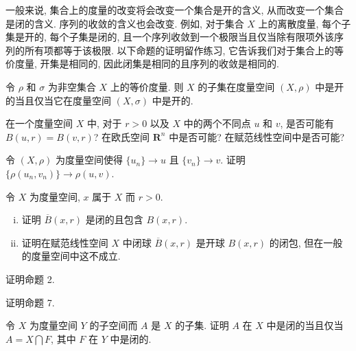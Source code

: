 \documentclass[../../main.tex]{subfiles}
\begin{document}
一般来说, 集合上的度量的改变将会改变一个集合是开的含义, 从而改变一个集合是闭的含义. 序列的收敛的含义也会改变. 例如, 对于集合 $X$ 上的离散度量, 每个子集是开的, 每个子集是闭的, 且一个序列收敛到一个极限当且仅当除有限项外该序列的所有项都等于该极限. 以下命题的证明留作练习, 它告诉我们对于集合上的等价度量, 开集是相同的, 因此闭集是相同的且序列的收敛是相同的.

\begin{proposition}\label{proposition:ch09-等价度量开集相同}
令 $\rho$ 和 $\sigma$ 为非空集合 $X$ 上的等价度量. 则 $X$ 的子集在度量空间 $(X,\rho)$ 中是开的当且仅当它在度量空间 $(X,\sigma)$ 中是开的.
\end{proposition}

\begin{exercise}\label{exercise:ch09-13}
在一个度量空间 $X$ 中, 对于 $r>0$ 以及 $X$ 中的两个不同点 $u$ 和 $v$, 是否可能有 $B(u,r)=B(v,r)$? 在欧氏空间 $\mathbf{R}^{n}$ 中是否可能? 在赋范线性空间中是否可能?
\end{exercise}

\begin{exercise}\label{exercise:ch09-14}
令 $(X,\rho)$ 为度量空间使得 $\{u_{n}\}\to u$ 且 $\{v_{n}\}\to v$. 证明 $\{\rho(u_{n},v_{n})\}\to\rho(u,v)$.
\end{exercise}

\begin{exercise}\label{exercise:ch09-15}
令 $X$ 为度量空间, $x$ 属于 $X$ 而 $r>0$.
\begin{enumerate}[(i)]
\item 证明 $\overline{B}(x,r)$ 是闭的且包含 $B(x,r)$.
\item 证明在赋范线性空间 $X$ 中闭球 $\overline{B}(x,r)$ 是开球 $B(x,r)$ 的闭包, 但在一般的度量空间中这不成立.
\end{enumerate}
\end{exercise}

\begin{exercise}\label{exercise:ch09-16}
证明命题 2.
\end{exercise}

\begin{exercise}\label{exercise:ch09-17}
证明命题 7.
\end{exercise}

\begin{exercise}\label{exercise:ch09-18}
令 $X$ 为度量空间 $Y$ 的子空间而 $A$ 是 $X$ 的子集. 证明 $A$ 在 $X$ 中是闭的当且仅当 $A=X\bigcap F$, 其中 $F$ 在 $Y$ 中是闭的.
\end{exercise}
\end{document}
